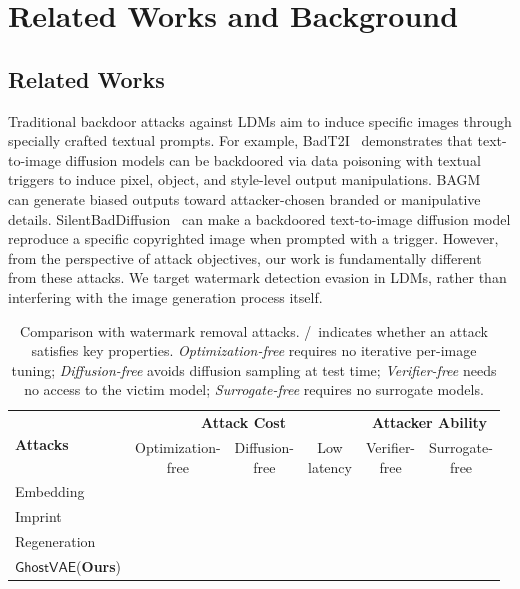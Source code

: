 \documentclass[letterpaper,twocolumn,10pt]{article}
\newcommand{\y}{\CIRCLE}
\newcommand{\n}{\Circle}
\newcommand{\mg}{$\mathsf{GhostVAE}$\xspace}
\newcommand{\mypara}[1]{\smallskip\noindent{\bf {#1}.} \xspace}
\begin{document}
\section{Related Works and Background}
\label{section:notation}
\subsection{Related Works}

\mypara{Backdoor Attacks against LDMs}
Traditional backdoor attacks against LDMs aim to induce specific images through specially crafted textual prompts.
For example, BadT2I~\cite{DBLP:conf/mm/ZhaiDSPF023} demonstrates that text-to-image diffusion models can be backdoored via data poisoning with textual triggers to induce pixel, object, and style-level output manipulations. 
BAGM~\cite{DBLP:journals/tifs/ViceAHM24} can generate biased outputs toward attacker-chosen branded or manipulative details.
SilentBadDiffusion~\cite{wang2024the} can make a backdoored text-to-image diffusion model reproduce a specific copyrighted image when prompted with a trigger.
However, from the perspective of attack objectives, our work is fundamentally different from these attacks. 
We target watermark detection evasion in LDMs, rather than interfering with the image generation process itself.

\begin{table}[t]
\centering
\caption{
Comparison with watermark removal attacks.
\y/\n~indicates whether an attack satisfies key properties.
\textit{Optimization-free} requires no iterative per-image tuning;
\textit{Diffusion-free} avoids diffusion sampling at test time;
\textit{Verifier-free} needs no access to the victim model;
\textit{Surrogate-free} requires no surrogate models.
}
\label{tab:attack_comparison_matrix_compact}
\footnotesize
\setlength{\tabcolsep}{2pt}
\begin{tabular}{l ccc cc}
\toprule
\multirow{2}{*}{\textbf{Attacks}} &
\multicolumn{3}{c}{\textbf{Attack Cost}} &
\multicolumn{2}{c}{\textbf{Attacker Ability}} \\
\cmidrule(lr){2-4}\cmidrule(lr){5-6}
& \makecell{Optimization-\\free} & \makecell{Diffusion-\\free} & \makecell{Low\\latency} &
\makecell{Verifier-\\free} & \makecell{Surrogate-\\free} \\
\midrule
Embedding~\cite{DBLP:conf/icml/AnDRAXDZMWGH24} &
\n & \y & \n &
\y & \n \\
Imprint~\cite{DBLP:conf/cvpr/0025LTFQ25} &
\n & \n & \n &
\y & \n \\
Regeneration~\cite{DBLP:conf/nips/ZhaoZSVGKVWL24} &
\y & \n & \n &
\y & \n \\
\midrule
\mg (\textbf{Ours}) &
\y & \y & \y &
\y & \y \\
\bottomrule
\end{tabular}
\end{table}
\end{document}
